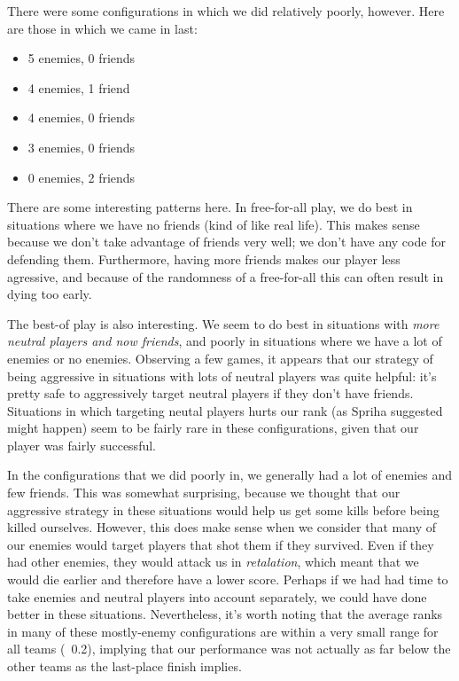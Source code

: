\documentclass[
10pt, %
letterpaper, %
oneside, %
headinclude,footinclude, %
english
]{article}
\begin{document}
There were some configurations in which we did relatively poorly, however. Here are those in which we came in last:
\begin{itemize}
  \item 5 enemies, 0 friends
  \item 4 enemies, 1 friend
  \item 4 enemies, 0 friends
  \item 3 enemies, 0 friends
  \item 0 enemies, 2 friends
\end{itemize}

There are some interesting patterns here. In free-for-all play, we do best in situations where we have no friends (kind of like real life). This makes sense because we don't take advantage of friends very well; we don't have any code for defending them. Furthermore, having more friends makes our player less agressive, and because of the randomness of a free-for-all this can often result in dying too early.

The best-of play is also interesting. We seem to do best in situations with \textit{more neutral players and now friends}, and poorly in situations where we have a lot of enemies or no enemies. Observing a few games, it appears that our strategy of being aggressive in situations with lots of neutral players was quite helpful: it's pretty safe to aggressively target neutral players if they don't have friends. Situations in which targeting neutal players hurts our rank (as Spriha suggested might happen) seem to be fairly rare in these configurations, given that our player was fairly successful.

In the configurations that we did poorly in, we generally had a lot of enemies and few friends. This was somewhat surprising, because we thought that our aggressive strategy in these situations would help us get some kills before being killed ourselves. However, this does make sense when we consider that many of our enemies would target players that shot them if they survived. Even if they had other enemies, they would attack us in \textit{retalation}, which meant that we would die earlier and therefore have a lower score. Perhaps if we had had time to take enemies and neutral players into account separately, we could have done better in these situations. Nevertheless, it's worth noting that the average ranks in many of these mostly-enemy configurations are within a very small range for all teams (~0.2), implying that our performance was not actually as far below the other teams as the last-place finish implies.
\end{document}

